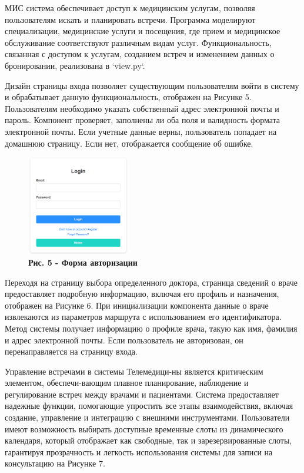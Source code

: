 \begin{multicols}{2}
МИС система обеспечивает доступ к медицинским услугам, позволяя
пользователям искать и планировать встречи. Программа моделируют
специализации, медицинские услуги и посещения, где прием и медицинское
обслуживание соответствуют различным видам услуг. Функциональность,
связанная с доступом к услугам, созданием встреч и изменением данных о
бронировании, реализована в `view.py`.

Дизайн страницы входа позволяет существующим пользователям войти в
систему и обрабатывает данную функциональность, отображен на Рисунке 5.
Пользователям необходимо указать собственный адрес электронной почты и
пароль. Компонент проверяет, заполнены ли оба поля и валидность формата
электронной почты. Если учетные данные верны, пользователь попадает на
домашнюю страницу. Если нет, отображается сообщение об ошибке.


\begin{figure}[H]
	\centering
	\includegraphics[width=0.4\textwidth]{assets/155}
	\caption*{\bfseries Рис. 5 - Форма авторизации}
\end{figure}

Переходя на страницу выбора определенного доктора, страница сведений о
враче предоставляет подробную информацию, включая его профиль и
назначения, отображен на Рисунке 6. При инициализации компонента данные
о враче извлекаются из параметров маршрута с использованием его
идентификатора. Метод системы получает информацию о профиле врача, такую
как имя, фамилия и адрес электронной почты. Если пользователь не
авторизован, он перенаправляется на страницу входа.


Управление встречами в системы Телемедици-ны является критическим
элементом, обеспечи-вающим плавное планирование, наблюдение и
регулирование встреч между врачами и пациентами. Система предоставляет
надежные функции, помогающие упростить все этапы взаимодействия, включая
создание, управление и интеграцию с внешними инструментами. Пользователи
имеют возможность выбирать доступные временные слоты из динамического
календаря, который отображает как свободные, так и зарезервированные
слоты, гарантируя прозрачность и легкость использования системы для
записи на консультацию на Рисунке 7.

\end{multicols}

